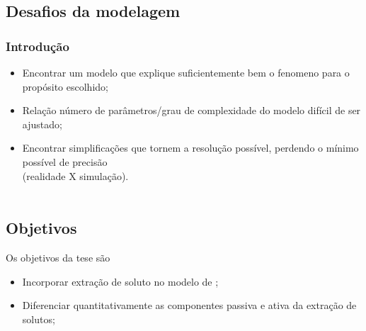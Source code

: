 \subsection{Desafios da modelagem}
\begin{frame}\frametitle{Introdução}
  \begin{itemize}
    \item Encontrar um modelo que explique suficientemente bem o fenomeno para o propósito escolhido;
    \item Relação número de parâmetros/grau de complexidade do modelo difícil de ser ajustado;
    \item Encontrar simplificações que tornem a resolução possível, perdendo o mínimo possível de precisão \\ (realidade X simulação). \\~\\
  \end{itemize}
\end{frame}


\subsection{Objetivos}
\begin{frame}
  Os objetivos da tese são
  \begin{itemize}
  \item Incorporar extração de soluto no modelo de \cite{liersolute};
  \item Diferenciar quantitativamente as componentes passiva e ativa da extração de solutos;
  \end{itemize}
\end{frame}


